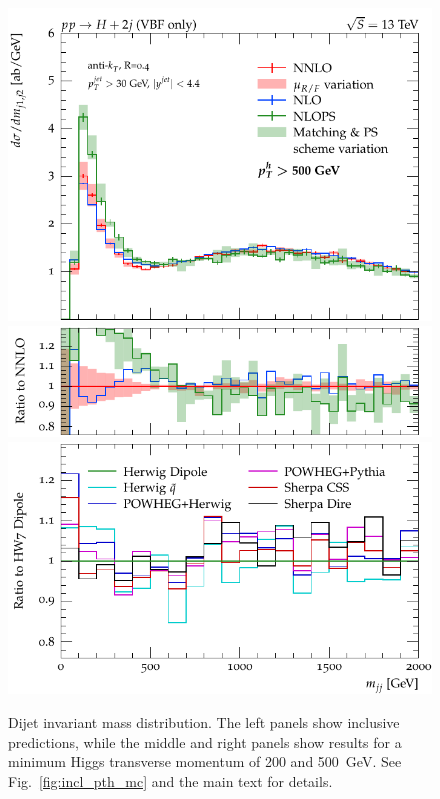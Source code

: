 \documentclass[10pt,prd,fleqn,superscriptaddress,notitlepage,nofootinbib,preprintnumbers,nobalancelastpage]{revtex4-1}
\begin{document}
\begin{figure}[tp]
\begin{minipage}{.32\textwidth}
    \includegraphics[width=\textwidth]{figures/tools/m_jj12_pth500.pdf}
    \includegraphics[width=\textwidth]{figures/tools/m_jj12_pth500_rFO.pdf}
    \includegraphics[width=\textwidth]{figures/tools/m_jj12_pth500_rMC.pdf}
  \end{minipage}
\caption{Dijet invariant mass distribution. The left panels show inclusive predictions,
while the middle and right panels show results for a minimum Higgs transverse momentum of 200 and 500~GeV.
See Fig.~\ref{fig:incl_pth_mc} and the main text for details.}
\label{fig:incl_m_jj12_mc}
\end{figure}
\end{document}
